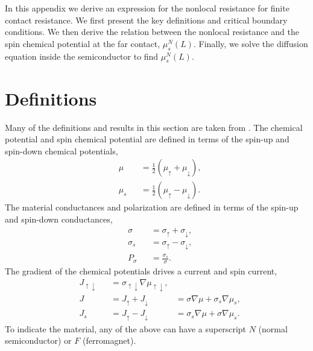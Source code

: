 In this appendix we derive an expression for
the nonlocal resistance for finite contact resistance.
We first present the key definitions and critical boundary conditions.
We then derive the relation between the nonlocal resistance
and the spin chemical potential at the far contact, $μ_s^N (L)$.
Finally, we solve the diffusion equation
inside the semiconductor to find $μ_s^N (L)$.

\section{Definitions}

Many of the definitions and results in this section are taken from
\cite{ActaPhysicaSlovaca.57.4_5.565-907}.
The chemical potential and spin chemical potential are defined in terms
of the spin-up and spin-down chemical potentials,
\begin{subequations}\label{eq:potentials}
  \begin{alignat}{2}
    & μ   && = \frac{1}{2} \left( μ_↑ + μ_↓ \right), \\
    & μ_s && = \frac{1}{2} \left( μ_↑ - μ_↓ \right).
  \end{alignat}
\end{subequations}
The material conductances and polarization are defined in terms
of the spin-up and spin-down conductances,
\begin{subequations}\label{eq:conductances}
  \begin{alignat}{2}
    & σ   && = σ_↑ + σ_↓, \\
    & σ_s && = σ_↑ - σ_↓,
    \\
    \label{eq:material.polarization}
    & P_σ && = \frac{σ_s}{σ}.
  \end{alignat}
\end{subequations}
The gradient of the chemical potentials drives a current and spin current,
\begin{subequations}\label{eq:currents}
  \begin{alignat}{3}
    & J_{↑↓} && = σ_{↑↓} ∇μ_{↑↓},
    \\
    \label{eq:currents.current}
    & J      && = J_↑ + J_↓ & = σ   ∇μ + σ_s ∇μ_s,
    \\
    \label{eq:currents.spincurrent}
    & J_s    && = J_↑ - J_↓ & = σ_s ∇μ + σ   ∇μ_s.
  \end{alignat}
\end{subequations}
To indicate the material, any of the above can have a superscript
$N$ (normal semiconductor) or $F$ (ferromagnet).

